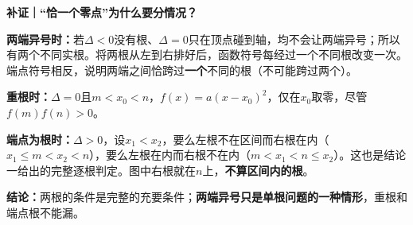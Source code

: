 \begin{proofbox}
\medskip
\textbf{\textcolor{CProof}{补证｜“恰一个零点”为什么要分情况？}}\par
\textbf{两端异号时：}若$\Delta<0$没有根、$\Delta=0$只在顶点碰到轴，均不会让两端异号；所以有两个不同实根。将两根从左到右排好后，函数符号每经过一个不同根改变一次。端点符号相反，说明两端之间恰跨过\textbf{一个}不同的根（不可能跨过两个）。
\par\textbf{重根时：}$\Delta=0$且$m<x_0<n$，$f(x)=a(x-x_0)^2$，仅在$x_0$取零，尽管$f(m)f(n)>0$。
\par\textbf{端点为根时：}$\Delta>0$，设$x_1<x_2$，要么左根不在区间而右根在内（$x_1\le m<x_2<n$），要么左根在内而右根不在内（$m<x_1<n\le x_2$）。这也是结论一给出的完整逐根判定。图中右根就在$n$上，\textbf{不算区间内的根}。
\begin{center}

\end{center}
\textbf{\textcolor{CProof}{结论：}}两根的条件是完整的充要条件；\textbf{两端异号只是单根问题的一种情形}，重根和端点根不能漏。
\end{proofbox}
